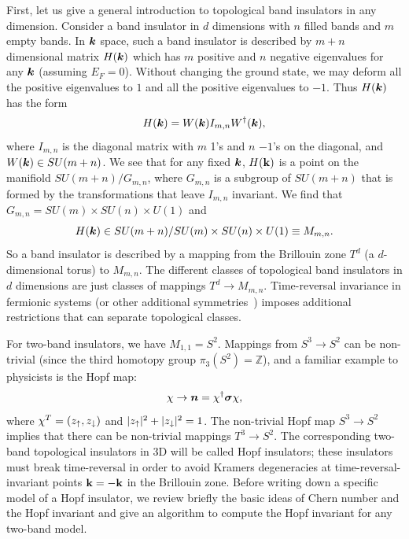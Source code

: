 \documentclass[prl,showpacs,superscriptaddress,twocolumn,preprintnumbers,amssymb,amsfonts]{revtex4}
\begin{document}
First, let us give a general introduction to topological band insulators in any
dimension. Consider a band insulator in $d$ dimensions with $n$ filled bands and
$m$ empty bands. In ${\boldsymbol{k}}$ space, such a band insulator is described by
$m+n$ dimensional matrix $H({\boldsymbol{k}})$ which has $m$ positive and $n$ negative
eigenvalues for any ${\boldsymbol{k}}$ (assuming $E_F=0$).  Without changing the
ground state, we may deform all
the positive eigenvalues to $1$ and all the positive eigenvalues to $-1$.  Thus $H({\boldsymbol{k}})$ has the form
\begin{equation}
 H({\boldsymbol{k}})=W({\boldsymbol{k}})I_{m,n}W^\dagger({\boldsymbol{k}}),
\end{equation}
where $I_{m,n}$ is the diagonal matrix with $m$ 1's and $n$ $-1$'s on the diagonal,
and $W({\boldsymbol{k}}) \in SU(m+n)$.  We see that for any fixed ${\boldsymbol{k}}$, $H({\bf k})$
is a point on the manifiold $SU(m+n)/G_{m,n}$, where $G_{m,n}$ is a  subgroup
of  $SU(m+n)$ that is formed by the transformations that leave $I_{m,n}$
invariant. We find that $G_{m,n}=SU(m)\times SU(n)\times U(1)$ and
\begin{equation*}
H({\boldsymbol{k}}) \in SU(m+n)/SU(m)\times SU(n)\times U(1) \equiv M_{m,n}.
\end{equation*}
So a band insulator is described by a mapping from the Brillouin
zone $T^d$ (a $d$-dimensional torus) to $M_{m,n}$.  The different classes of
topological band insulators in $d$ dimensions are just classes of
mappings $T^d \to M_{m,n}$.  Time-reversal invariance in fermionic systems (or other additional symmetries~\cite{schnyder}) imposes additional restrictions that can separate topological
classes.

For two-band insulators, we have $M_{1,1}=S^2$. Mappings from $S^3\to S^2$
can be non-trivial (since the third homotopy group $\pi_3(S^2)=\mathbb{Z}$), and a familiar example to physicists is the Hopf map:
\begin{equation*}
\chi \to {\boldsymbol{n}}=\chi^\dagger {\boldsymbol{\sigma} } \chi ,
\end{equation*} 
where $\chi^T=(z_\uparrow,z_\downarrow)$ and $|z_\uparrow|^2+|z_\downarrow|^2=1$.
The non-trivial Hopf map $S^3\to S^2$ implies that there can be non-trivial
mappings $T^3\to S^2$. The corresponding two-band topological insulators in 3D will be called Hopf insulators; these insulators must break time-reversal in order to avoid Kramers degeneracies at time-reversal-invariant points ${\bf k} = -{\bf k}$ in the Brillouin zone.  Before writing down a specific model of a Hopf insulator, we review briefly the basic ideas of Chern number and the Hopf invariant and give an algorithm to compute the Hopf invariant for any two-band model.
\end{document}
